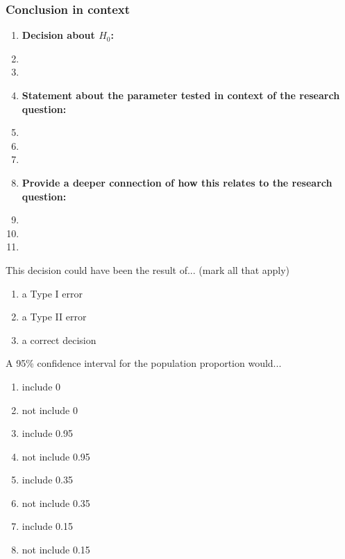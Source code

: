 \begin{frame}
\frametitle{Conclusion in context}
\begin{enumerate}
    \item \textbf{Decision about $H_0$:}
    \item[]
    \item[]
    \item \textbf{Statement about the parameter tested in context of the research question:}
    \item[]
    \item[]
    \item[]
    \item \textbf{Provide a deeper connection of how this relates to the research question:}
    \item[]
    \item[]
    \item[]
\end{enumerate}
\end{frame}

\begin{frame}
\begin{clicker}
{This decision could have been the result of... (mark all that apply)}
\begin{enumerate}
   \item
   a Type I error
   \item
   a Type II error
   \item
   a correct decision
\end{enumerate}
\end{clicker}
\end{frame}

\begin{frame}
\begin{clicker}
{A 95\% confidence interval for the population proportion would...}
\begin{enumerate}
   \item
   include 0
   \item
   not include 0
   \item
   include 0.95
   \item
   not include 0.95
   \item
   include 0.35
   \item
   not include 0.35
   \item
   include 0.15
   \item
   not include 0.15
\end{enumerate}
\end{clicker}
\end{frame}

